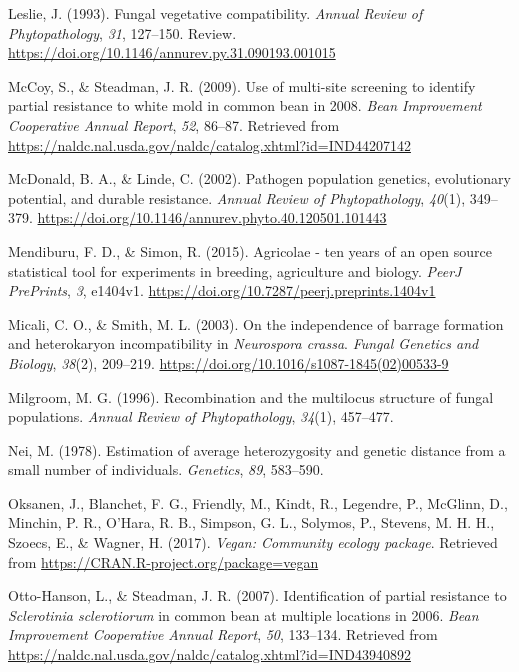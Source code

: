 \hypertarget{ref-leslie1993fungal}{}
Leslie, J. (1993). Fungal vegetative compatibility. \emph{Annual Review
of Phytopathology}, \emph{31}, 127--150. Review.
\url{https://doi.org/10.1146/annurev.py.31.090193.001015}

\hypertarget{ref-mccoy2009use}{}
McCoy, S., \& Steadman, J. R. (2009). Use of multi-site screening to
identify partial resistance to white mold in common bean in 2008.
\emph{Bean Improvement Cooperative Annual Report}, \emph{52}, 86--87.
Retrieved from
\url{https://naldc.nal.usda.gov/naldc/catalog.xhtml?id=IND44207142}

\hypertarget{ref-mcdonald2002pathogen}{}
McDonald, B. A., \& Linde, C. (2002). Pathogen population genetics,
evolutionary potential, and durable resistance. \emph{Annual Review of
Phytopathology}, \emph{40}(1), 349--379.
\url{https://doi.org/10.1146/annurev.phyto.40.120501.101443}

\hypertarget{ref-mendiburu2015agricolae}{}
Mendiburu, F. D., \& Simon, R. (2015). Agricolae - ten years of an open
source statistical tool for experiments in breeding, agriculture and
biology. \emph{PeerJ PrePrints}, \emph{3}, e1404v1.
\url{https://doi.org/10.7287/peerj.preprints.1404v1}

\hypertarget{ref-micali2003independence}{}
Micali, C. O., \& Smith, M. L. (2003). On the independence of barrage
formation and heterokaryon incompatibility in \emph{Neurospora crassa}.
\emph{Fungal Genetics and Biology}, \emph{38}(2), 209--219.
\url{https://doi.org/10.1016/s1087-1845(02)00533-9}

\hypertarget{ref-milgroom1996recombination}{}
Milgroom, M. G. (1996). Recombination and the multilocus structure of
fungal populations. \emph{Annual Review of Phytopathology},
\emph{34}(1), 457--477.

\hypertarget{ref-nei1978estimation}{}
Nei, M. (1978). Estimation of average heterozygosity and genetic
distance from a small number of individuals. \emph{Genetics}, \emph{89},
583--590.

\hypertarget{ref-vegan}{}
Oksanen, J., Blanchet, F. G., Friendly, M., Kindt, R., Legendre, P.,
McGlinn, D., Minchin, P. R., O'Hara, R. B., Simpson, G. L., Solymos, P.,
Stevens, M. H. H., Szoecs, E., \& Wagner, H. (2017). \emph{Vegan:
Community ecology package}. Retrieved from
\url{https://CRAN.R-project.org/package=vegan}

\hypertarget{ref-otto2007identification}{}
Otto-Hanson, L., \& Steadman, J. R. (2007). Identification of partial
resistance to \emph{Sclerotinia sclerotiorum} in common bean at multiple
locations in 2006. \emph{Bean Improvement Cooperative Annual Report},
\emph{50}, 133--134. Retrieved from
\url{https://naldc.nal.usda.gov/naldc/catalog.xhtml?id=IND43940892}

